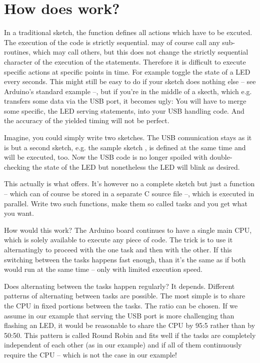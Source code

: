 \chapter{How does \rtos{} work?}

In a traditional sketch, the function  defines all actions
which have to be excuted. The execution of the code is strictly
sequential.  may of course call any sub-routines, which may
call others, but this does not change the strictly sequential character of
the execution of the statements. Therefore it is difficult to execute
specific actions at specific points in time. For example toggle the state
of a LED every seconds. This might still be easy to do if your sketch does
nothing else -- see Arduino's standard example  --, but if
you're in the middle of a skecth, which e.g. transfers some data via the
USB port, it becomes ugly: You will have to merge some specific, the LED
serving statements, into your USB handling code. And the accuracy of the
yielded timing will not be perfect.

Imagine, you could simply write two sketches. The USB comunication stays
as it is but a second sketch, e.g. the sample sketch , is
defined at the same time and will be executed, too. Now the USB code is no
longer spoiled with double-checking the state of the LED but nonetheless
the LED will blink as desired.

This actually is what \rtos{} offers. It's however no a complete sketch
but just a function -- which can of course be stored in a separate C
source file --, which is executed in parallel. Write two such functions,
make them so called tasks and you get what you want.

How would this work? The Arduino board continues to have a single main
CPU, which is solely available to execute any piece of code. The trick is
to use it alternatingly to proceed with the one task and then with the
other. If this switching between the tasks happens fast enough, than it's
the same as if both would run at the same time -- only with limited
execution speed.

Does alternating between the tasks happen regularly? It depends. Different
patterns of alternating between tasks are possible. The most simple is to
share the CPU in fixed portions between the tasks. The ratio can be
chosen. If we assume in our example that serving the USB port is more
challenging than flashing an LED, it would be reasonable to share the CPU
by 95:5 rather than by 50:50. This pattern is called Round Robin and fits
well if the tasks are completely independent of each other (as in our
example) and if all of them continuously require the CPU -- which is not
the case in our example!

